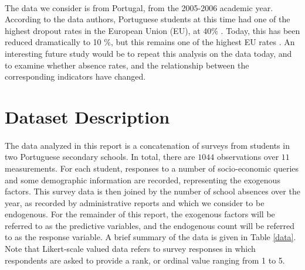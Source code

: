 \documentclass[12pt, titlepage]{article}
\begin{document}
	\paragraph{} The data we consider is from Portugal, from the 2005-2006 academic year. According to the data authors, Portuguese students at this time had one of the highest dropout rates in the European Union (EU), at 40\% \cite{Cortez::2008}. Today, this has been reduced dramatically to 10 \%, but this remains one of the highest EU rates \cite{eurostat}. An interesting future study would be to repeat this analysis on the data today, and to examine whether absence rates, and the relationship between the corresponding indicators have changed. 
	
	\section{Dataset Description}
	\paragraph{} The data analyzed in this report is a concatenation of surveys from students in two Portuguese secondary schools. In total, there are $1044$ observations over $11$ measurements. For each student, responses to a number of socio-economic queries and some demographic information are recorded, representing the exogenous factors. This survey data is then joined by the number of school absences over the year, as recorded by administrative reports and which we consider to be endogenous. For the remainder of this report, the exogenous factors will be referred to as the predictive variables, and the endogenous count will be referred to as the response variable. A brief summary of the data is given in Table \ref{data}. Note that Likert-scale valued data refers to survey responses in which respondents are asked to provide a rank, or ordinal value ranging from 1 to 5. 
	
\end{document}

